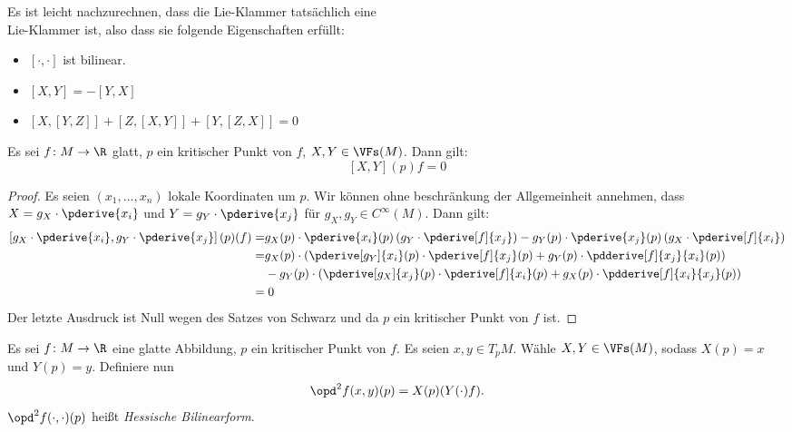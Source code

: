 \begin{remark}
    Es ist leicht nachzurechnen, dass die Lie-Klammer tatsächlich eine \\ Lie-Klammer ist,
    also dass sie folgende Eigenschaften erfüllt:
    \begin{itemize}
        \item $[\cdot, \cdot]$ ist bilinear.
        \item $[X, Y] = -[Y, X]$
        \item $[X, [Y, Z]] + [Z, [X, Y]] + [Y, [Z, X]] = 0$
    \end{itemize}
\end{remark}

\begin{prop}
    \label{prop: lie-klammer ist null}
    Es sei $f \colon M \to \R$ glatt, $p$ ein kritischer Punkt von $f$, 
    $X, Y \in \VFs (M)$. Dann gilt:
    \[ [X, Y] (p) f = 0 \]
\end{prop}

\begin{proof}
    Es seien $(x_1, ..., x_n)$ lokale Koordinaten um $p$. Wir können ohne beschränkung
    der Allgemeinheit annehmen, dass $X = g_X \cdot \pderive{x_i}$ und 
    $Y = g_Y \cdot \pderive{x_j}$ für $g_X, g_Y \in C^{\infty} (M)$. Dann gilt:
    \begin{align*}
        \left[g_X \cdot \pderive{x_i}, g_Y \cdot \pderive{x_j}\right] (p) (f) = & 
            g_X (p) \cdot \pderive{x_i} (p) \left(g_Y \cdot \pderive[f]{x_j} \right) -
            g_Y (p) \cdot \pderive{x_j} (p) \left(g_X \cdot \pderive[f]{x_i} \right) \\
        = & g_X (p) \cdot \left( \pderive[g_Y]{x_i}(p) \cdot \pderive[f]{x_j}(p) + 
                g_Y(p) \cdot \pdderive[f]{x_j}{x_i}(p) \right) \\ 
        & - g_Y (p) \cdot \left( \pderive[g_X]{x_j}(p) \cdot \pderive[f]{x_i}(p) + 
            g_X (p) \cdot \pdderive[f]{x_i}{x_j}(p) \right) \\
        = & \; 0
    \end{align*}
    Der letzte Ausdruck ist Null wegen des Satzes von Schwarz und da $p$ ein kritischer
    Punkt von $f$ ist.
\end{proof}

\begin{definition}
    Es sei $f \colon M \to \R$ eine glatte Abbildung, $p$ ein kritischer Punkt von $f$.
    Es seien $x, y \in T_pM$. Wähle $X, Y \in \VFs (M)$, sodass $X(p) = x$ und 
    $Y(p) = y$. Definiere nun
    \[ \opd^2 f (x, y) (p) = X(p)(Y(\cdot)f). \]
    $\opd^2 f (\cdot, \cdot) (p)$ heißt \textit{Hessische Bilinearform}. 
\end{definition}

